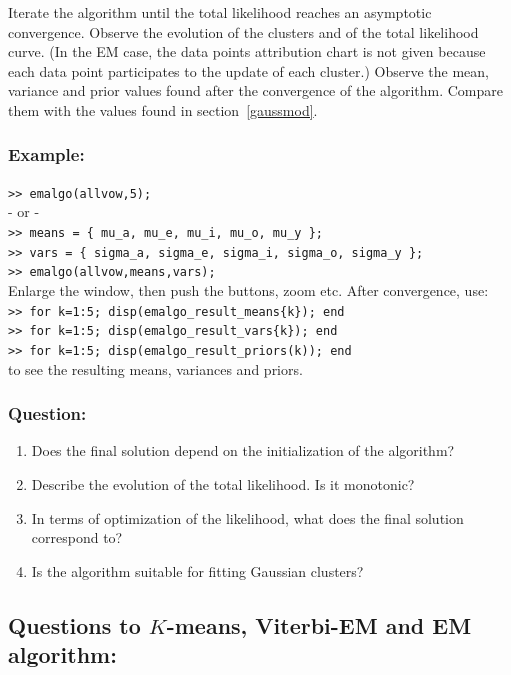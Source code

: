 \documentclass[a4paper]{article}
\newcommand{\mat}[1]{{\tt >> #1} \\}
\begin{document}
Iterate the algorithm until the total likelihood reaches an asymptotic
convergence. Observe the evolution of the clusters and of the total
likelihood curve. (In the EM case, the data points attribution chart is not
given because each data point participates to the update of each cluster.)
Observe the mean, variance and prior values found after the convergence of
the algorithm. Compare them with the values found in
section~\ref{gaussmod}.


\subsubsection*{Example:}
\mat{emalgo(allvow,5);}
- or - \\
\mat{means =  \{ mu\_a, mu\_e, mu\_i, mu\_o, mu\_y \};}
\mat{vars = \{ sigma\_a, sigma\_e, sigma\_i, sigma\_o, sigma\_y \};}
\mat{emalgo(allvow,means,vars);}
Enlarge the window, then push the buttons, zoom etc.
After convergence, use:\\
\mat{for k=1:5; disp(emalgo\_result\_means\{k\}); end}
\mat{for k=1:5; disp(emalgo\_result\_vars\{k\}); end}
\mat{for k=1:5; disp(emalgo\_result\_priors(k)); end}
to see the resulting means, variances and priors.


\subsubsection*{Question:}
\begin{enumerate}
\item Does the final solution depend on the initialization of the
  algorithm?
\item Describe the evolution of the total likelihood. Is it monotonic?
\item In terms of optimization of the likelihood, what does the final
  solution correspond to?
\item Is the algorithm suitable for fitting Gaussian clusters?
\end{enumerate}


\subsection*{Questions to $K$-means, Viterbi-EM and EM algorithm:}
\end{document}
